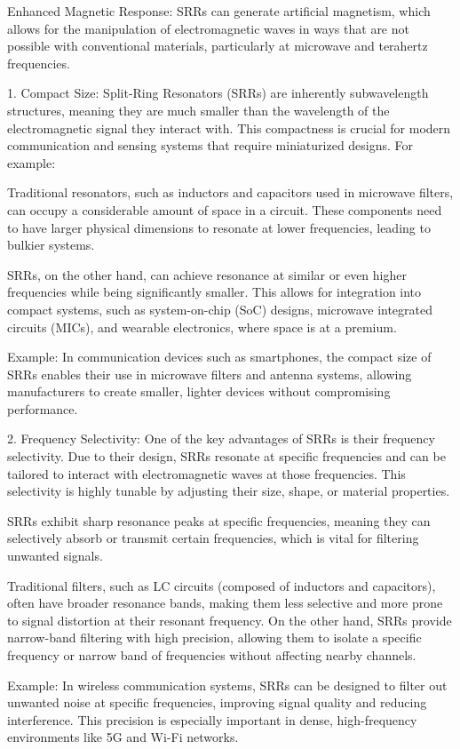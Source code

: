 \documentclass[conference]{IEEEtran}
\begin{document}
Enhanced Magnetic Response: SRRs can generate artificial magnetism, which allows for the manipulation of electromagnetic waves in ways that are not possible with conventional materials, particularly at microwave and terahertz frequencies.

1. Compact Size: Split-Ring Resonators (SRRs) are inherently subwavelength structures, meaning they are much smaller than the wavelength of the electromagnetic signal they interact with. This compactness is crucial for modern communication and sensing systems that require miniaturized designs. For example:

Traditional resonators, such as inductors and capacitors used in microwave filters, can occupy a considerable amount of space in a circuit. These components need to have larger physical dimensions to resonate at lower frequencies, leading to bulkier systems.

SRRs, on the other hand, can achieve resonance at similar or even higher frequencies while being significantly smaller. This allows for integration into compact systems, such as system-on-chip (SoC) designs, microwave integrated circuits (MICs), and wearable electronics, where space is at a premium.

Example: In communication devices such as smartphones, the compact size of SRRs enables their use in microwave filters and antenna systems, allowing manufacturers to create smaller, lighter devices without compromising performance.

2. Frequency Selectivity: One of the key advantages of SRRs is their frequency selectivity. Due to their design, SRRs resonate at specific frequencies and can be tailored to interact with electromagnetic waves at those frequencies. This selectivity is highly tunable by adjusting their size, shape, or material properties.

SRRs exhibit sharp resonance peaks at specific frequencies, meaning they can selectively absorb or transmit certain frequencies, which is vital for filtering unwanted signals.

Traditional filters, such as LC circuits (composed of inductors and capacitors), often have broader resonance bands, making them less selective and more prone to signal distortion at their resonant frequency. On the other hand, SRRs provide narrow-band filtering with high precision, allowing them to isolate a specific frequency or narrow band of frequencies without affecting nearby channels.

Example: In wireless communication systems, SRRs can be designed to filter out unwanted noise at specific frequencies, improving signal quality and reducing interference. This precision is especially important in dense, high-frequency environments like 5G and Wi-Fi networks.
\end{document}
